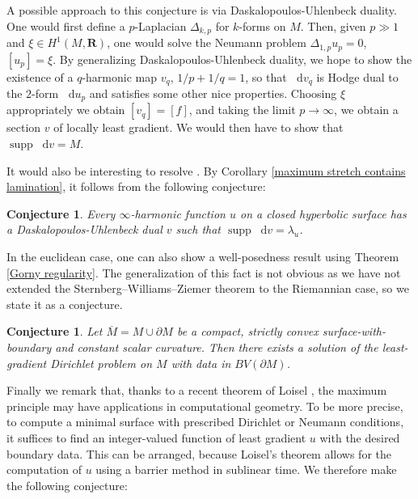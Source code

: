 \documentclass[reqno,10pt]{amsart}
\newcommand{\RR}{\mathbf{R}}
\DeclareMathOperator{\supp}{supp}
\newcommand*\dif{\mathop{}\!\mathrm{d}}
\newtheorem{conjecture}[theorem]{Conjecture}
\theoremstyle{definition}
\numberwithin{equation}{section}
\begin{document}
A possible approach to this conjecture is via Daskalopoulos-Uhlenbeck duality.
One would first define a $p$-Laplacian $\Delta_{k,p}$ for $k$-forms on $M$.
Then, given $p \gg 1$ and $\xi \in H^1(M, \RR)$, one would solve the Neumann problem $\Delta_{1, p} u_p = 0$, $[u_p] = \xi$.
By generalizing Daskalopoulos-Uhlenbeck duality, we hope to show the existence of a $q$-harmonic map $v_q$, $1/p + 1/q = 1$, so that $\dif v_q$ is Hodge dual to the $2$-form $\dif u_p$ and satisfies some other nice properties.
Choosing $\xi$ appropriately we obtain $[v_q] = [f]$, and taking the limit $p \to \infty$, we obtain a section $v$ of locally least gradient.
We would then have to show that $\supp \dif v = M$.

It would also be interesting to resolve \cite[Problem 9.5]{daskalopoulos2020transverse}.
By Corollary \ref{maximum stretch contains lamination}, it follows from the following conjecture:

\begin{conjecture}\label{two laminations agree}
Every $\infty$-harmonic function $u$ on a closed hyperbolic surface has a Daskalopoulos-Uhlenbeck dual $v$ such that $\supp \dif v = \lambda_u$.
\end{conjecture}

In the euclidean case, one can also show a well-posedness result \cite[Theorem 1.1]{górny2017planar} using Theorem \ref{Gorny regularity}.
The generalization of this fact is not obvious as we have not extended the Sternberg--Williams--Ziemer theorem \cite{ZiemerWilliamsSternberg1992} to the Riemannian case, so we state it as a conjecture.

\begin{conjecture}
Let $\overline M = M \cup \partial M$ be a compact, strictly convex surface-with-boundary and constant scalar curvature.
Then there exists a solution of the least-gradient Dirichlet problem on $M$ with data in $BV(\partial M)$.
\end{conjecture}

Finally we remark that, thanks to a recent theorem of Loisel \cite{Loisel20}, the maximum principle may have applications in computational geometry.
To be more precise, to compute a minimal surface with prescribed Dirichlet or Neumann conditions, it suffices to find an integer-valued function of least gradient $u$ with the desired boundary data.
This can be arranged, because Loisel's theorem allows for the computation of $u$ using a barrier method in sublinear time. We therefore make the following conjecture:
\end{document}
